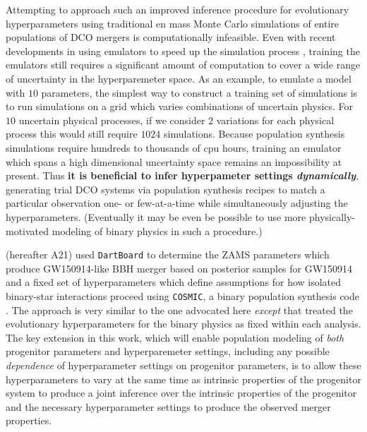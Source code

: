 \documentclass[twocolumn]{aastex631}
\begin{document}
Attempting to approach such an improved inference procedure for evolutionary
hyperparameters using traditional en mass Monte Carlo simulations of entire
populations of DCO mergers is computationally infeasible. Even with recent
developments in using emulators to speed up the simulation process
\citep[e.g.][]{Wong2021}, training the emulators still requires a significant
amount of computation to cover a wide range of uncertainty in the hyperparemeter
space. As an example, to emulate a model with $10$ parameters, the simplest way
to construct a training set of simulations is to run simulations on a grid which
varies combinations of uncertain physics. For $10$ uncertain physical processes,
if we consider $2$ variations for each physical process this would still require
$1024$ simulations. Because population synthesis simulations require hundreds to
thousands of cpu hours, training an emulator which spans a high dimensional
uncertainty space remains an impossibility at present.  Thus \textbf{it is
beneficial to infer hyperpameter settings \emph{dynamically}}, generating trial
DCO systems via population synthesis recipes to match a particular observation
one- or few-at-a-time while simultaneously adjusting the hyperparameters.
(Eventually it may be even be possible to use more physically-motivated modeling
of binary physics \citep[e.g.][]{Gallego-Garcia2021} in such a procedure.)

\citet{Andrews2021} (hereafter A21) used \texttt{DartBoard} \citep{Andrews2018}
to determine the ZAMS parameters which produce GW150914-like BBH merger based on
posterior samples for GW150914 and a fixed set of hyperparameters which define
assumptions for how isolated binary-star interactions proceed using
\texttt{COSMIC}, a binary population synthesis code \citep{Breivik2020}. The
approach is very similar to the one advocated here \emph{except} that
\citet{Andrews2021} treated the evolutionary hyperparameters for the binary
physics as fixed within each analysis.  The key extension in this work, which
will enable population modeling of \emph{both} progenitor parameters and
hyperparemeter settings, including any possible \emph{dependence} of
hyperparameter settings on progenitor parameters, is to allow these
hyperparameters to vary at the same time as intrinsic properties of the
progenitor system to produce a joint inference over the intrinsic properties of
the progenitor and the necessary hyperparameter settings to produce the observed
merger properties.
\end{document}
